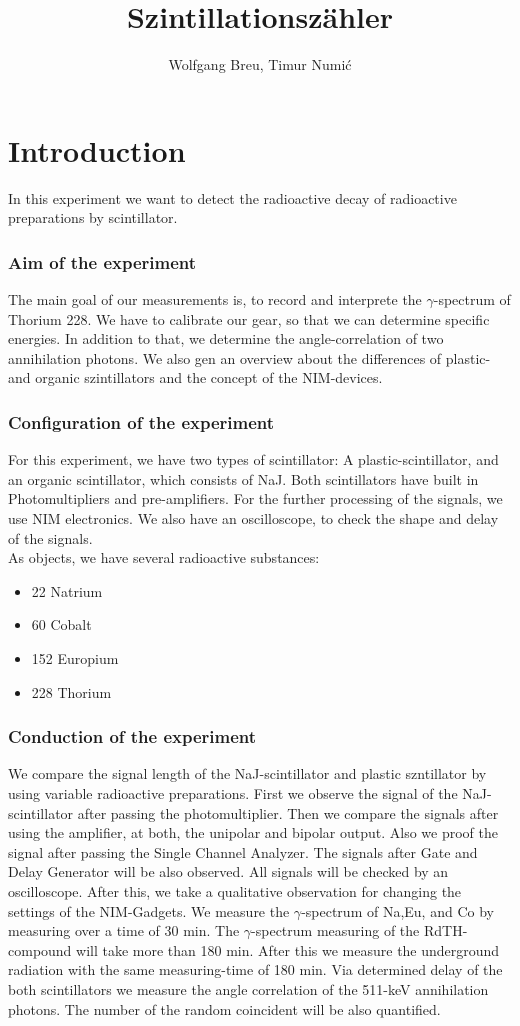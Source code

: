 \documentclass[10pt,a4paper]{article}
\author{Wolfgang Breu, Timur Numi\'{c}}
\title{Szintillationszähler}
\begin{document}
\maketitle
\part{Introduction}
In this experiment we want to detect the radioactive decay of radioactive preparations by scintillator.
\section*{Aim of the experiment}
The main goal of our measurements is, to record and interprete the $\gamma$-spectrum of Thorium 228. We have to calibrate our gear, so that we can determine specific energies. In addition to that, we determine the angle-correlation of two annihilation photons. We also gen an overview about the differences of plastic- and organic szintillators and the concept of the NIM-devices.
\section{Configuration of the experiment}
For this experiment, we have two types of scintillator: A plastic-scintillator, and an organic scintillator, which consists of NaJ. Both scintillators have built in Photomultipliers and pre-amplifiers. For the further processing of the signals, we  use NIM electronics. We also have an oscilloscope, to check the shape and delay of the signals. \\ As objects, we have several radioactive substances: 
\begin{itemize}
\item 22 Natrium
\item 60 Cobalt
\item 152 Europium
\item 228 Thorium
\end{itemize}
\section{Conduction of the experiment}
We compare the signal length of the NaJ-scintillator and plastic szntillator by using variable radioactive preparations. First we observe the signal of the NaJ-scintillator after passing the photomultiplier. Then we compare the signals after using the amplifier, at both, the unipolar and bipolar output. Also we proof the signal after passing the Single Channel Analyzer. The signals after Gate and Delay Generator will be also observed. All signals will be checked by an oscilloscope. After this, we take a qualitative observation for changing the settings of the NIM-Gadgets.
We measure the $\gamma$-spectrum of Na,Eu, and Co by measuring over a time of 30 min. The $\gamma$-spectrum measuring of the RdTH-compound will take more than 180 min. After this we measure the underground radiation with the same measuring-time of 180 min.
Via determined delay of the both scintillators we measure the angle correlation of the 511-keV annihilation photons. The number of the random coincident will be also quantified.
\end{document}
